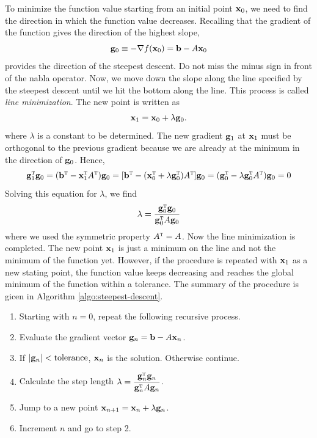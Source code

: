 To minimize the function value starting from an initial point $\vb{x}_0$, we need to find the direction in which the function value decreases. Recalling that the gradient of the function gives the direction of the highest slope, 
\begin{equation}
\vb{g}_0 \equiv -\nabla f(\vb{x}_0) = \vb{b} - A \vb{x}_0
\end{equation}
provides the direction of the steepest descent. Do not miss the minus sign in front of the nabla operator. Now, we move down the slope along the line specified by the steepest descent until we hit the bottom along the line. This process is called \textit{line minimization}.  The new point is written as
\begin{equation}
\vb{x}_1 = \vb{x}_0 + \lambda \vb{g}_0.
\end{equation}
where $\lambda$ is a constant to be determined.
The new gradient $\vb{g}_1$ at $\vb{x}_1$ must be orthogonal to the previous gradient because we are already at the minimum in the direction of $\vb{g}_0$.  Hence,
\begin{equation}
\vb{g}_1^\textsc{t} \vb{g}_0 = ( \vb{b}^\textsc{t} - \vb{x}_1^\textsc{t} A^\textsc{t} )
\vb{g}_0
=[\vb{b}^\textsc{t} - (\vb{x}_0^\textsc{t} + \lambda \vb{g}_0^\textsc{t}) A^\textsc{t}]\vb{g}_0
=(\vb{g}_0^\textsc{t} - \lambda \vb{g}_0^\textsc{t} A^\textsc{t} ) \vb{g}_0 = 0
\end{equation}
Solving this equation for $\lambda$, we find 
\begin{equation}
\lambda = \frac{\vb{g}_0^\textsc{t} \vb{g}_0}{\vb{g}_0^\textsc{t} A \vb{g}_0}
\end{equation}
where we used the symmetric property $A^\textsc{t}=A$. Now the line minimization is completed.
The new point $\vb{x}_1$ is just a minimum on the line and not the minimum of the function yet.  However, if the procedure is repeated with $\vb{x}_1$ as a new stating point, the function value keeps decreasing and reaches the global minimum of the function within a tolerance.
The summary of the procedure is  gicen in Algorithm \ref{algo:steepest-descent}.
\begin{myalgobox}
   \label{algo:steepest-descent}

   \medskip
   \begin{enumerate}
      \item  Starting with $n=0$, repeat the following recursive process.
      \item  Evaluate the gradient vector $\vb{g}_n = \vb{b} - A \vb{x}_n$.
      \item  If $|\vb{g}_n| < \text{tolerance}$, $\vb{x}_n$ is the solution.  Otherwise continue.
      \item  Calculate the step length $\lambda = \displaystyle\frac{\vb{g}_n^\textsc{t} \vb{g}_n}{\vb{g}_n^\textsc{t} A \vb{g}_n}$.
      \item  Jump to a new point $\vb{x}_{n+1}= \vb{x}_n + \lambda \vb{g}_n$.
      \item  Increment $n$ and go to step 2.
   \end{enumerate}
\end{myalgobox}


